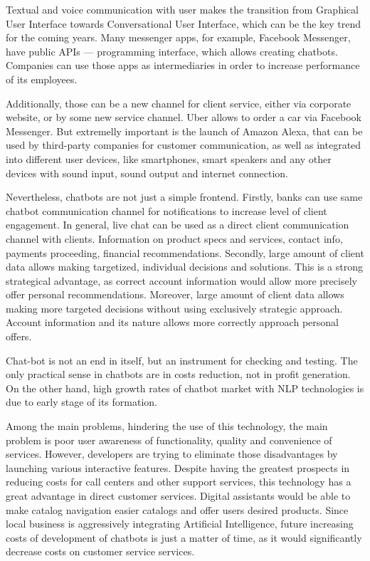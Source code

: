 Textual and voice communication with user makes the transition from Graphical User Interface towards Conversational User Interface, which can be the key trend for the coming years.
Many messenger apps, for example, Facebook Messenger, have public APIs — programming interface, which allows creating chatbots.
Companies can use those apps as intermediaries in order to increase performance of its employees.

Additionally, those can be a new channel for client service, either via corporate website, or by some new service channel.
Uber allows to order a car via Facebook Messenger.
But extremelly important is the launch of Amazon Alexa, that can be used by third-party companies for customer communication, as well as integrated into different user devices, like smartphones, smart speakers and any other devices with sound input, sound output and internet connection.

Nevertheless, chatbots are not just a simple frontend.
Firstly, banks can use same chatbot communication channel for notifications to increase level of client engagement.
In general, live chat can be used as a direct client communication channel with clients.
Information on product specs and services, contact info, payments proceeding, financial recommendations.
Secondly, large amount of client data allows making targetized, individual decisions and solutions.
This is a strong strategical advantage, as correct account information would allow more precisely offer personal recommendations.
Moreover, large amount of client data allows making more targeted decisions without using exclusively strategic approach. 
Account information and its nature allows more correctly approach personal offers.

Chat-bot is not an end in itself, but an instrument for checking and testing.
The only practical sense in chatbots are in costs reduction, not in profit generation.
On the other hand, high growth rates of chatbot market with NLP technologies is due to early stage of its formation.

Among the main problems, hindering the use of this technology, the main problem is poor user awareness of functionality, quality and convenience of services.
However, developers are trying to eliminate those disadvantages by launching various interactive features.
Despite having the greatest prospects in reducing costs for call centers and other support services, this technology has a great advantage in direct customer services.
Digital assistants would be able to make catalog navigation easier catalogs and offer users desired products.
Since local business is aggressively integrating Artificial Intelligence, future increasing costs of development of chatbots is just a matter of time,
as it would significantly decrease costs on customer service services.

